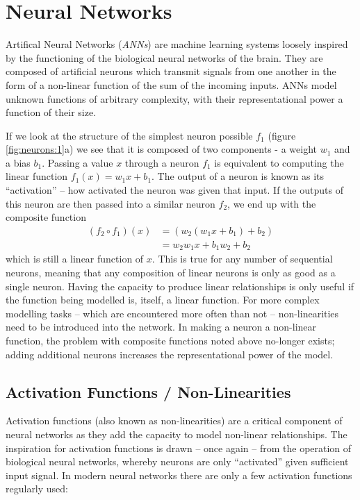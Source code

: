 \documentclass{report}
\begin{document}
	\section{Neural Networks}
	Artifical Neural Networks (\textit{ANNs}) are machine learning systems loosely inspired by the functioning of the biological neural networks of the brain. They are composed of artificial neurons which transmit signals from one another in the form of a non-linear function of the sum of the incoming inputs. ANNs model unknown functions of arbitrary complexity, with their representational power a function of their size. \par
	If we look at the structure of the simplest neuron possible $f_1$ (figure \ref{fig:neurons:1}a) we see that it is composed of two components - a weight $w_1$ and a bias $b_1$. Passing a value $x$ through a neuron $f_1$ is equivalent to computing the linear function $f_1(x) = w_1x + b_1$. The output of a neuron is known as its ``activation'' -- how activated the neuron was given that input.
	If the outputs of this neuron are then passed into a similar neuron $f_2$, we end up with the composite function 
	\begin{align}
	 (f_2\circ f_1)(x) &= (w_2(w_1x + b_1) + b_2) \\
	 &= w_2w_1x + b_1w_2 + b_2	
	\end{align}
	which is still a linear function of $x$. This is true for any number of sequential neurons, meaning that any composition of linear neurons is only as good as a single neuron. Having the capacity to produce linear relationships is only useful if the function being modelled is, itself, a linear function. For more complex modelling tasks -- which are encountered more often than not -- non-linearities need to be introduced into the network. In making a neuron a non-linear function, the problem with composite functions noted above no-longer exists; adding additional neurons increases the representational power of the model. \par
	
	\subsection{Activation Functions / Non-Linearities}
	Activation functions (also known as non-linearities) are a critical component of neural networks as they add the capacity to model non-linear relationships. The inspiration for activation functions is drawn -- once again -- from the operation of biological neural networks, whereby neurons are only ``activated'' given sufficient input signal. In modern neural networks there are only a few activation functions regularly used: \par
\end{document}
